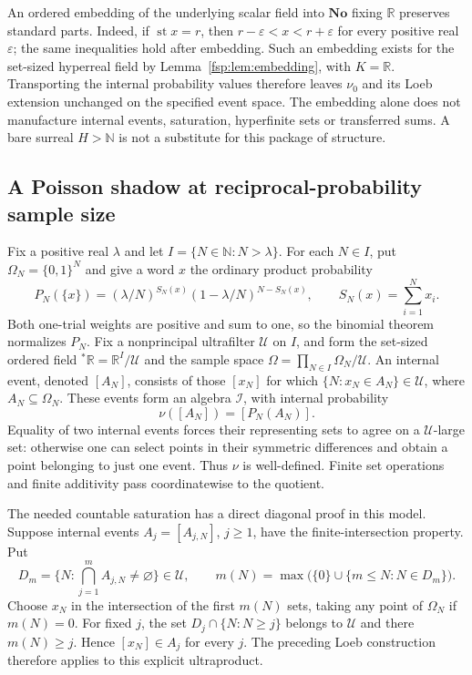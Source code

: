 \documentclass[11pt,a4paper]{article}
\numberwithin{equation}{section}
\theoremstyle{definition}
\theoremstyle{remark}
\newcommand{\R}{\mathbb R}
\newcommand{\N}{\mathbb N}
\newcommand{\No}{\mathbf{No}}
\newcommand{\st}{\operatorname{st}}
\begin{document}
An ordered embedding of the underlying scalar field into $\No$ fixing
$\R$ preserves standard parts. Indeed, if $\st x=r$, then
$r-\varepsilon<x<r+\varepsilon$ for every positive real $\varepsilon$;
the same inequalities hold after embedding. Such an embedding exists
for the set-sized hyperreal field by Lemma~\ref{fsp:lem:embedding}, with
$K=\R$. Transporting the internal probability values therefore leaves
$\nu_0$ and its Loeb extension unchanged on the specified event space.
The embedding alone does not manufacture internal events, saturation,
hyperfinite sets or transferred sums. A bare surreal $H>\N$ is not a
substitute for this package of structure.

\subsection{A Poisson shadow at reciprocal-probability sample size}\label{fsp:sub:poisson}

Fix a positive real $\lambda$ and let $I=\{N\in\N:N>\lambda\}$.
For each $N\in I$, put $\Omega_N=\{0,1\}^N$ and give a word $x$ the
ordinary product probability
\[
 P_N(\{x\})=(\lambda/N)^{S_N(x)}(1-\lambda/N)^{N-S_N(x)},
 \qquad S_N(x)=\sum_{i=1}^N x_i.
\]
Both one-trial weights are positive and sum to one, so the binomial
theorem normalizes $P_N$. Fix a nonprincipal ultrafilter $\mathcal U$
on $I$, and form the set-sized ordered field ${}^*\R=\R^I/\mathcal U$
and the sample space $\Omega=\prod_{N\in I}\Omega_N/\mathcal U$.
An internal event, denoted $[A_N]$, consists of those $[x_N]$ for which
$\{N:x_N\in A_N\}\in\mathcal U$, where $A_N\subseteq\Omega_N$.
These events form an algebra $\mathcal I$, with internal probability
\[
 \nu([A_N])=[P_N(A_N)].
\]
Equality of two internal events forces their representing sets to agree
on a $\mathcal U$-large set: otherwise one can select points in their
symmetric differences and obtain a point belonging to just one event.
Thus $\nu$ is well-defined. Finite set operations and finite additivity
pass coordinatewise to the quotient.

The needed countable saturation has a direct diagonal proof in this
model. Suppose internal events $A_j=[A_{j,N}]$, $j\ge1$, have the
finite-intersection property. Put
\[
 D_m=\{N:\bigcap_{j=1}^m A_{j,N}\ne\varnothing\}\in\mathcal U,
 \qquad
 m(N)=\max\bigl(\{0\}\cup\{m\le N:N\in D_m\}\bigr).
\]
Choose $x_N$ in the intersection of the first $m(N)$ sets, taking any
point of $\Omega_N$ if $m(N)=0$. For fixed $j$, the set
$D_j\cap\{N:N\ge j\}$ belongs to $\mathcal U$ and there $m(N)\ge j$.
Hence $[x_N]\in A_j$ for every $j$. The preceding Loeb construction
therefore applies to this explicit ultraproduct.
\end{document}
